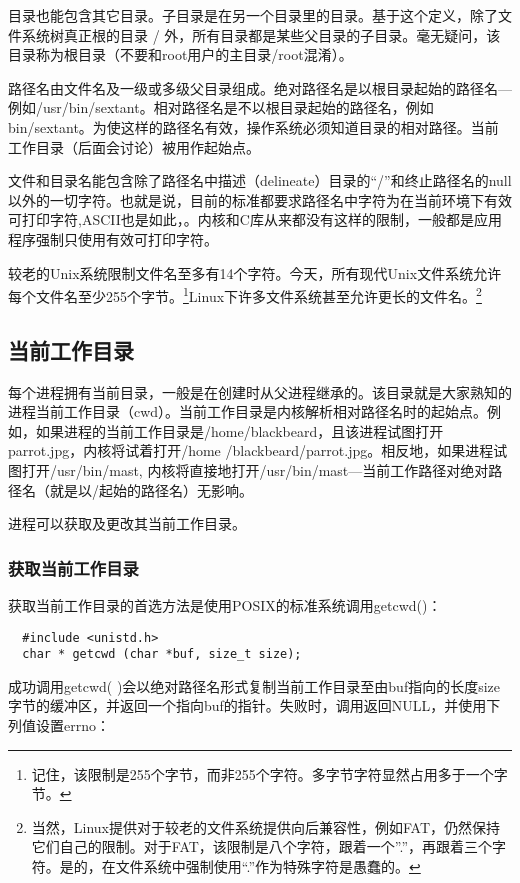 目录也能包含其它目录。子目录是在另一个目录里的目录。基于这个定义，除了文件系统树真正根的目录 / 外，所有目录都是某些父目录的子目录。毫无疑问，该目录称为根目录（不要和root用户的主目录/root混淆）。

路径名由文件名及一级或多级父目录组成。绝对路径名是以根目录起始的路径名—例如/usr/bin/sextant。相对路径名是不以根目录起始的路径名，例如bin/sextant。为使这样的路径名有效，操作系统必须知道目录的相对路径。当前工作目录（后面会讨论）被用作起始点。 

文件和目录名能包含除了路径名中描述（delineate）目录的“/”和终止路径名的null以外的一切字符。也就是说，目前的标准都要求路径名中字符为在当前环境下有效可打印字符,ASCII也是如此，。内核和C库从来都没有这样的限制，一般都是应用程序强制只使用有效可打印字符。

较老的Unix系统限制文件名至多有14个字符。今天，所有现代Unix文件系统允许每个文件名至少255个字节。\footnote[1]{记住，该限制是255个字节，而非255个字符。多字节字符显然占用多于一个字节。}Linux下许多文件系统甚至允许更长的文件名。\footnote[2]{当然，Linux提供对于较老的文件系统提供向后兼容性，例如FAT，仍然保持它们自己的限制。对于FAT，该限制是八个字符，跟着一个''.''，再跟着三个字符。是的，在文件系统中强制使用“.”作为特殊字符是愚蠢的。}

\subsection{当前工作目录}

每个进程拥有当前目录，一般是在创建时从父进程继承的。该目录就是大家熟知的进程当前工作目录（cwd）。当前工作目录是内核解析相对路径名时的起始点。例如，如果进程的当前工作目录是/home/blackbeard，且该进程试图打开parrot.jpg，内核将试着打开/home /blackbeard/parrot.jpg。相反地，如果进程试图打开/usr/bin/mast, 内核将直接地打开/usr/bin/mast—当前工作路径对绝对路径名（就是以/起始的路径名）无影响。

进程可以获取及更改其当前工作目录。

\subsubsection{获取当前工作目录}

获取当前工作目录的首选方法是使用POSIX的标准系统调用getcwd()：

\begin{lstlisting}
  #include <unistd.h>
  char * getcwd (char *buf, size_t size);
\end{lstlisting}

成功调用getcwd( )会以绝对路径名形式复制当前工作目录至由buf指向的长度size字节的缓冲区，并返回一个指向buf的指针。失败时，调用返回NULL，并使用下列值设置errno：

